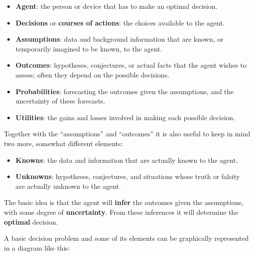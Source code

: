 \documentclass[
  a4paper,
  DIV=11,
  numbers=noendperiod,
  oneside]{scrreprt}
\begin{document}
\begin{itemize}
\item
  {\textbf{Agent}}: the person or device that has to make an optimal
  decision.
\item
  {\textbf{Decisions}} or {\textbf{courses of actions}}: the choices
  available to the agent.
\item
  {\textbf{Assumptions}}: data and background information that are
  known, or temporarily imagined to be known, to the agent.
\item
  {\textbf{Outcomes}}: hypotheses, conjectures, or actual facts that the
  agent wishes to assess; often they depend on the possible decisions.
\item
  {\textbf{Probabilities}}: forecasting the outcomes given the
  assumptions, and the uncertainty of these forecasts.
\item
  {\textbf{Utilities}}: the gains and losses involved in making each
  possible decision.
\end{itemize}

Together with the ``assumptions'' and ``outcomes'' it is also useful to
keep in mind two more, somewhat different elements:

\begin{itemize}
\item
  {\textbf{Knowns}}: the data and information that are actually known to
  the agent.
\item
  {\textbf{Unknowns}}: hypotheses, conjectures, and situations whose
  truth or falsity are actually unknown to the agent.
\end{itemize}

The basic idea is that the agent will {\textbf{infer}} the outcomes
given the assumptions, with some degree of {\textbf{uncertainty}}. From
these inferences it will determine the {\textbf{optimal}} decision.

A basic decision problem and some of its elements can be graphically
represented in a diagram like this:
\end{document}
